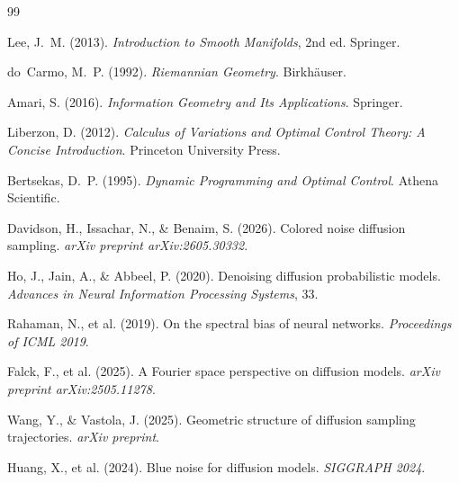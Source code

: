 \documentclass[12pt, a4paper]{article}
\theoremstyle{plain}
\theoremstyle{definition}
\theoremstyle{remark}
\begin{document}


\begin{thebibliography}{99}


Lee, J.~M. (2013).
\newblock \emph{Introduction to Smooth Manifolds}, 2nd ed.
\newblock Springer.

do~Carmo, M.~P. (1992).
\newblock \emph{Riemannian Geometry}.
\newblock Birkh\"{a}user.

Amari, S. (2016).
\newblock \emph{Information Geometry and Its Applications}.
\newblock Springer.

Liberzon, D. (2012).
\newblock \emph{Calculus of Variations and Optimal Control Theory:
  A Concise Introduction}.
\newblock Princeton University Press.

Bertsekas, D.~P. (1995).
\newblock \emph{Dynamic Programming and Optimal Control}.
\newblock Athena Scientific.


Davidson, H., Issachar, N., \& Benaim, S. (2026).
\newblock Colored noise diffusion sampling.
\newblock \emph{arXiv preprint arXiv:2605.30332}.

Ho, J., Jain, A., \& Abbeel, P. (2020).
\newblock Denoising diffusion probabilistic models.
\newblock \emph{Advances in Neural Information Processing Systems}, 33.

Rahaman, N., et al. (2019).
\newblock On the spectral bias of neural networks.
\newblock \emph{Proceedings of ICML 2019}.

Falck, F., et al. (2025).
\newblock A Fourier space perspective on diffusion models.
\newblock \emph{arXiv preprint arXiv:2505.11278}.

Wang, Y., \& Vastola, J. (2025).
\newblock Geometric structure of diffusion sampling trajectories.
\newblock \emph{arXiv preprint}.

Huang, X., et al. (2024).
\newblock Blue noise for diffusion models.
\newblock \emph{SIGGRAPH 2024}.


\end{thebibliography}
\end{document}

